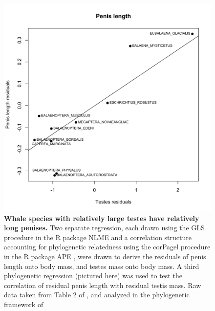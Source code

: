 \documentclass[12pt]{article}
\begin{document}
\begin{figure}
\begin{center}
  \includegraphics[width=\textwidth]{S2}
\end{center}
\caption{
\textbf{Whale species with relatively large testes have relatively long penises.} 
Two separate regression, each drawn using the GLS procedure in the R package NLME and a correlation structure accounting for phylogenetic relatedness \citep{pagel1999} using the corPagel procedure in the R package APE \citep{paradis2004}, were drawn to derive the residuals of penis length onto body mass, and testes mass onto body mass. A third phylogenetic regression (pictured here) was used to test the correlation of residual penis length with residual testis mass. Raw data taken from Table 2 of \citep{brownell1986}, and analyzed in the phylogenetic framework of \citep{mcgowen2009}
}
\end{figure}


\end{document}
